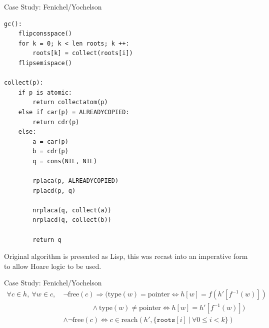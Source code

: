 \documentclass[usenames,dvipsnames]{beamer}
\renewcommand{\iff}{\Leftrightarrow}
\renewcommand{\implies}{\Rightarrow}
\newcommand{\reach}[2]{\mathrm{reach}\left(#1, #2\right)}
\newcommand{\free}[1]{\mathrm{free}\left(#1\right)}
\newcommand{\type}[1]{\mathrm{type}\left(#1\right)}
\newcommand{\typointer}{\mathrm{pointer}}
\begin{document}
\begin{frame}[fragile]{Case Study: Fenichel/Yochelson}
  \begin{lstlisting}
gc():
    flipconsspace()
    for k = 0; k < len roots; k ++:
        roots[k] = collect(roots[i])
    flipsemispace()

collect(p):
    if p is atomic:
        return collectatom(p)
    else if car(p) = ALREADYCOPIED:
        return cdr(p)
    else:
        a = car(p)
        b = cdr(p)
        q = cons(NIL, NIL)

        rplaca(p, ALREADYCOPIED)
        rplacd(p, q)

        nrplaca(q, collect(a))
        nrplacd(q, collect(b))

        return q
  \end{lstlisting}

  Original algorithm is presented as Lisp, this was recast into an
  imperative form to allow Hoare logic to be used.


\end{frame}

\begin{frame}[fragile]{Case Study: Fenichel/Yochelson}
  \begin{align*}
    \forall c \in h,\ \forall w \in c,\ &\lnot\free{c} \implies
    (\type{w} = \typointer \iff h[w] = f(h'[f^{-1}(w)])\\
    &\quad\quad\quad\quad \land \type{w} \neq \typointer
    \iff h[w] = h'[f^{-1}(w)])\\
    &\land \lnot\free{c} \iff c \in
    \reach{h'}{\{\mathtt{roots}[i]~|~\forall 0 \leq i < k\}}
  \end{align*}

\end{frame}
\end{document}
